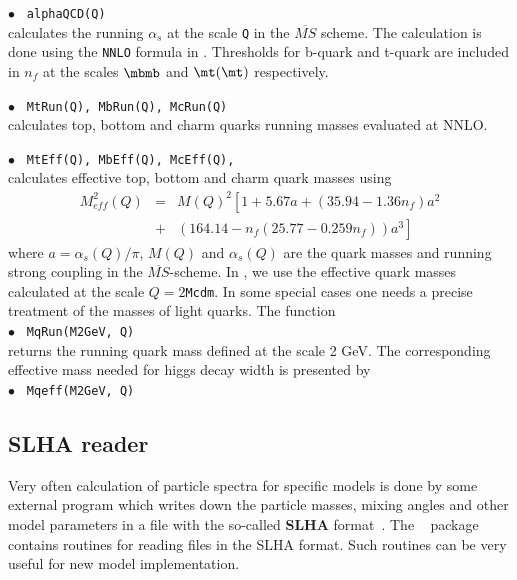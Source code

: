 \documentclass[12pt,a4paper]{article}
\begin{document}
\noindent$\bullet$ \verb| alphaQCD(Q)|\\
calculates the  running $\alpha_s$ at the scale \verb|Q| in the
$\overline{MS}$ scheme. The calculation is done using the
\verb|NNLO| formula in \cite{Eidelman:2004wy}. Thresholds for
b-quark and t-quark  are included in  $n_f$ at the scales $\mbmb$
and $\mt(\mt)$ respectively.

\noindent$\bullet$ \verb| MtRun(Q), MbRun(Q), McRun(Q) | \\
calculates top, bottom and charm quarks running masses evaluated
at NNLO.

\noindent$\bullet$ \verb| MtEff(Q), MbEff(Q), McEff(Q),  | \\
calculates effective top, bottom and charm quark masses using
~\cite{Eidelman:2004wy}
\begin{eqnarray}
\label{meff}
 M_{eff}^2(Q)&=&M(Q)^2\left[1+5.67a + (35.94-1.36n_f)a^2 \right.\nonumber\\
 &+& \left.(164.14-n_f(25.77-0.259n_f))a^3\right]
\end{eqnarray}
where $a=\alpha_s(Q)/\pi$,    $M(Q)$  and $\alpha_s(Q)$    are the
quark masses and running strong coupling  in the
$\overline{MS}$-scheme. In \micro, we use the effective
quark masses calculated at the scale $Q=2${\tt Mcdm}.
In some special cases one needs a precise treatment of the
masses of light quarks. The function\\
\noindent$\bullet$ \verb| MqRun(M2GeV, Q)| \\
returns the  running quark mass defined at the scale 2 GeV. The corresponding
effective mass needed for higgs decay width is presented by \\
\noindent$\bullet$ \verb| Mqeff(M2GeV, Q)|


\subsection{SLHA reader}
\label{SLHA} 
Very often calculation of particle spectra for specific 
models is done by some external program which writes down 
the particle masses, mixing angles and other 
model parameters in a file with the so-called  {\bf SLHA} format~\cite{Skands:2003cj,Allanach:2008qq}. 
The \micro~ package contains routines for  reading files in the SLHA format. 
Such routines can be very useful for new model implementation.
\end{document}
